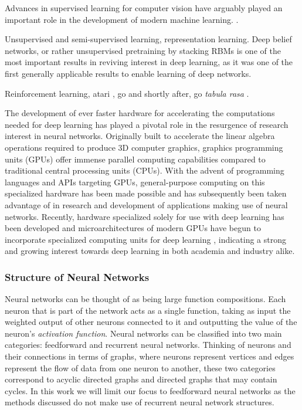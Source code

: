 Advances in supervised learning for computer vision have arguably played an important role in the development of modern machine learning. \cite{imagenet}.

Unsupervised and semi-supervised learning, representation learning. Deep belief networks, or rather unsupervised pretraining by stacking RBMs is one of the most important results in reviving interest in deep learning, as it was one of the first generally applicable results to enable learning of deep networks. 

Reinforcement learning, atari \cite{deep_atari}, go \cite{alphago} and shortly after, go \textit{tabula rasa} \cite{alphazero}.

The development of ever faster hardware for accelerating the computations needed for deep learning has played a pivotal role in the resurgence of research interest in neural networks. Originally built to accelerate the linear algebra operations required to produce 3D computer graphics, graphics programming units (GPUs) offer immense parallel computing capabilities compared to traditional central processing units (CPUs). With the advent of programming languages and APIs targeting GPUs, general-purpose computing on this specialized hardware has been made possible and has subsequently been taken advantage of in research and development of applications making use of neural networks. Recently, hardware specialized solely for use with deep learning has been developed \cite{tpu} and microarchitectures of modern GPUs have begun to incorporate specialized computing units for deep learning \cite{nvidia_tensor_core}, indicating a strong and growing interest towards deep learning in both academia and industry alike.

\subsubsection{Structure of Neural Networks}

Neural networks can be thought of as being large function compositions. Each neuron that is part of the network acts as a single function, taking as input the weighted output of other neurons connected to it and outputting the value of the neuron's \textit{activation function}. Neural networks can be classified into two main categories: feedforward and recurrent neural networks. Thinking of neurons and their connections in terms of graphs, where neurons represent vertices and edges represent the flow of data from one neuron to another, these two categories correspond to acyclic directed graphs and directed graphs that may contain cycles. In this work we will limit our focus to feedforward neural networks as the methods discussed do not make use of recurrent neural network structures.

